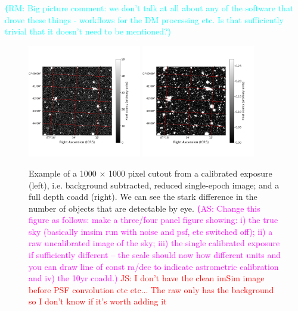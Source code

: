 \documentclass[twocolumn]{aastex62}
\newcommand{\rachel}[1]{{\textcolor{cyan}{{\textbf (RM: #1)}}}}
\newcommand{\as}[1]{{\textcolor{magenta}{{\textbf (AS: #1)}}}}
\begin{document}
\rachel{Big picture comment: we don't talk at all about any of the software that drove these things - workflows for the DM processing etc.  Is that sufficiently trivial that it doesn't need to be mentioned?}

\begin{figure}
\centering
\includegraphics[width=0.44\textwidth]{calexp_example.png}
\includegraphics[width=0.44\textwidth]{coadd_example.png}
\caption{Example of a 1000 $\times$ 1000 pixel cutout from a calibrated exposure (left), i.e. background subtracted, reduced single-epoch image; and a full depth coadd (right). We can see the stark difference in the number of objects that are detectable by eye.
\as{Change this figure as follows: make a three/four panel figure showing: i) the true sky (basically imsim run with noise and psf, etc switched off); ii) a raw uncalibrated image of the sky; iii) the single calibrated exposure if sufficiently different -- the scale should now how different units and you can draw line of const ra/dec to indicate astrometric calibration and iv) the 10yr coadd.} \textcolor{red}{JS: I don't have the clean imSim image before PSF convolution etc etc... The raw only has the background so I don't know if it's worth adding it}}
\label{fig:coadd_example}
\end{figure}
\end{document}

